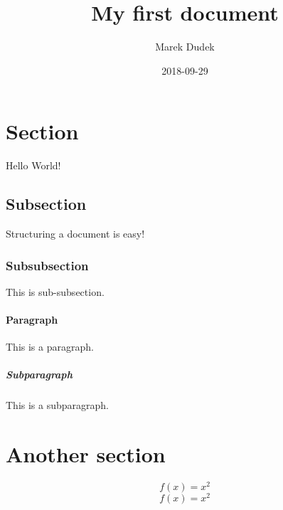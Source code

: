 \documentclass{article}
\title{My first document}
\date{2018-09-29}
\author{Marek Dudek}
\begin{document}
    \maketitle
    \newpage
    \section{Section}
    Hello World!
    \subsection{Subsection}
    Structuring a document is easy!
    \subsubsection{Subsubsection}
    This is sub-subsection.
    \paragraph{Paragraph}
    This is a paragraph.
    \subparagraph{Subparagraph}
    This is a subparagraph.
    \section{Another section}
    \begin{equation}
        f(x) = x^2
    \end{equation}
    \begin{equation*}
        f(x) = x^2
    \end{equation*}
\end{document}
